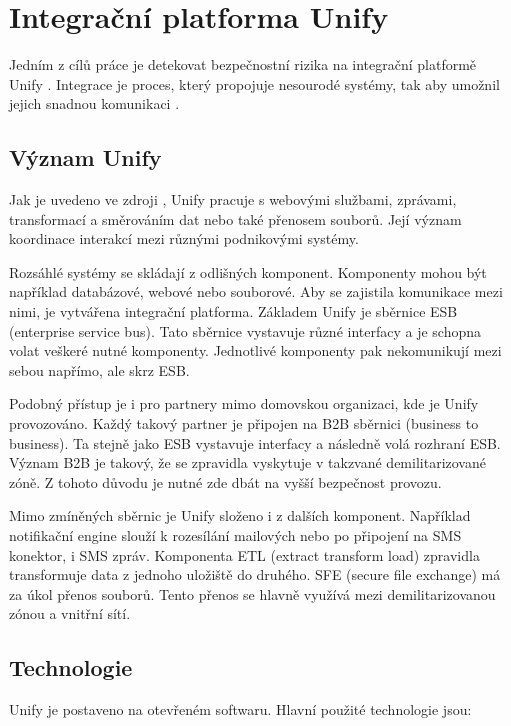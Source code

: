 \documentclass[thesis=M,czech]{FITthesis}[2012/10/20]
\begin{document}
	\section{Integrační platforma Unify}
		\label{sec:unify}
		Jedním z cílů práce je detekovat bezpečnostní rizika na integrační platformě Unify \cite{unify}. Integrace je proces, který propojuje nesourodé systémy, tak aby umožnil jejich snadnou komunikaci \cite{integration}. 
		
		\subsection{Význam Unify}
			\label{sec:meaning-unify}
			Jak je uvedeno ve zdroji \cite{unify}, Unify pracuje s webovými službami, zprávami, transformací a směrováním dat nebo také přenosem souborů. Její význam koordinace interakcí mezi různými podnikovými systémy.
			
			Rozsáhlé systémy se skládají z odlišných komponent. Komponenty mohou být například databázové, webové nebo souborové. Aby se zajistila komunikace mezi nimi, je vytvářena integrační platforma. Základem Unify je sběrnice ESB (enterprise service bus). Tato sběrnice vystavuje různé interfacy a je schopna volat veškeré nutné komponenty. Jednotlivé komponenty pak nekomunikují mezi sebou napřímo, ale skrz ESB. 
			
			Podobný přístup je i pro partnery mimo domovskou organizaci, kde je Unify provozováno. Každý takový partner je připojen na B2B sběrnici (business to business). Ta stejně jako ESB vystavuje interfacy a následně volá rozhraní ESB. Význam B2B je takový, že se zpravidla vyskytuje v takzvané demilitarizované zóně. Z tohoto důvodu je nutné zde dbát na vyšší bezpečnost provozu.
			
			Mimo zmíněných sběrnic je Unify složeno i z dalších komponent. Například notifikační engine slouží k rozesílání mailových nebo po připojení na SMS konektor, i SMS zpráv. Komponenta ETL (extract transform load) zpravidla transformuje data z jednoho uložiště do druhého. SFE (secure file exchange) má za úkol přenos souborů. Tento přenos se hlavně využívá mezi demilitarizovanou zónou a vnitřní sítí.
			
		\subsection{Technologie}
			\label{sec:unify-technologi}
			Unify je postaveno na otevřeném softwaru. Hlavní použité technologie jsou: 
			
\end{document}
